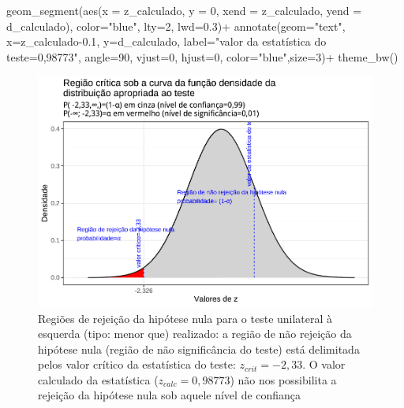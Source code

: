 \documentclass[
]{book}
\newenvironment{Shaded}{\begin{snugshade}}{\end{snugshade}}
\newcommand{\AttributeTok}[1]{\textcolor[rgb]{0.77,0.63,0.00}{#1}}
\newcommand{\DecValTok}[1]{\textcolor[rgb]{0.00,0.00,0.81}{#1}}
\newcommand{\FloatTok}[1]{\textcolor[rgb]{0.00,0.00,0.81}{#1}}
\newcommand{\FunctionTok}[1]{\textcolor[rgb]{0.00,0.00,0.00}{#1}}
\newcommand{\NormalTok}[1]{#1}
\newcommand{\SpecialCharTok}[1]{\textcolor[rgb]{0.00,0.00,0.00}{#1}}
\newcommand{\StringTok}[1]{\textcolor[rgb]{0.31,0.60,0.02}{#1}}
\begin{document}
\begin{Shaded}
\begin{Highlighting}[]
  \FunctionTok{geom\_segment}\NormalTok{(}\FunctionTok{aes}\NormalTok{(}\AttributeTok{x =}\NormalTok{ z\_calculado, }\AttributeTok{y =} \DecValTok{0}\NormalTok{, }\AttributeTok{xend =}\NormalTok{ z\_calculado, }\AttributeTok{yend =}\NormalTok{ d\_calculado), }\AttributeTok{color=}\StringTok{"blue"}\NormalTok{, }\AttributeTok{lty=}\DecValTok{2}\NormalTok{, }\AttributeTok{lwd=}\FloatTok{0.3}\NormalTok{)}\SpecialCharTok{+}
  \FunctionTok{annotate}\NormalTok{(}\AttributeTok{geom=}\StringTok{"text"}\NormalTok{, }\AttributeTok{x=}\NormalTok{z\_calculado}\FloatTok{{-}0.1}\NormalTok{, }\AttributeTok{y=}\NormalTok{d\_calculado, }\AttributeTok{label=}\StringTok{"valor da estatística do teste=0,98773"}\NormalTok{, }\AttributeTok{angle=}\DecValTok{90}\NormalTok{, }\AttributeTok{vjust=}\DecValTok{0}\NormalTok{, }\AttributeTok{hjust=}\DecValTok{0}\NormalTok{, }\AttributeTok{color=}\StringTok{"blue"}\NormalTok{,}\AttributeTok{size=}\DecValTok{3}\NormalTok{)}\SpecialCharTok{+}
  \FunctionTok{theme\_bw}\NormalTok{()}
\end{Highlighting}
\end{Shaded}

\begin{figure}

{\centering \includegraphics[width=1\linewidth]{apostila_files/figure-latex/fig84-1} 

}

\caption{Regiões de rejeição da hipótese nula para o teste unilateral à esquerda (tipo: menor que) realizado: a região de não rejeição da hipótese nula (região de não significância do teste) está delimitada pelos valor crítico da estatística do teste: $z_{crit}=-2,33$. O valor calculado da estatística ($z_{calc}=0,98773$) não nos possibilita a rejeição da hipótese nula sob aquele nível de confiança}\label{fig:fig84}
\end{figure}
\end{document}
